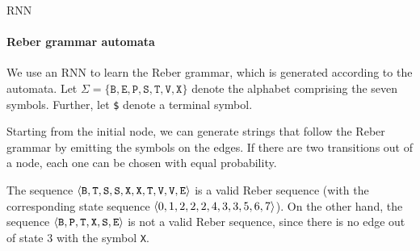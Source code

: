 %
%
\begin{frame}{RNN}
\framesubtitle{Reber grammar automata}
    We use an RNN to learn the Reber grammar, which is generated
    according to the automata.%
Let
    $\Sigma = \{\texttt{B}, \texttt{E}, \texttt{P}, \texttt{S},
    \texttt{T}, \texttt{V}, \texttt{X}\}$ denote the alphabet comprising
    the seven symbols. Further, let \texttt{\$} denote a terminal symbol.

\medskip

    Starting from the initial node, we can generate strings that follow
    the Reber grammar by emitting the symbols on the edges. If there are
    two transitions out of a node, each one can be chosen with equal
    probability. 

\medskip

The sequence $\langle \texttt{B}, \texttt{T}, \texttt{S},
        \texttt{S}, \texttt{X}, \texttt{X}, \texttt{T}, \texttt{V},
    \texttt{V}, \texttt{E} \rangle$ is a valid Reber sequence (with the
    corresponding state sequence $\langle 0,1,2,2,2,4,3,3,5,6,7 \rangle$). On the
    other hand, the sequence
    $\langle \texttt{B},\texttt{P},\texttt{T},\texttt{X},\texttt{S},\texttt{E} \rangle$
    is not a valid Reber sequence, since there is no edge out of state
    $3$ with the symbol \texttt{X}.
\end{frame}

